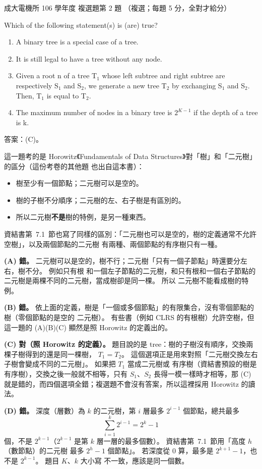 \begin{pastexam}[label={px:ncku-106-ee-ds-02}]{成大電機所 106 學年度 複選題第 2 題}
（複選；每題 5 分，全對才給分）

Which of the following statement(s) is (are) true?
\begin{enumerate}[label=(\Alph*)]
\item A binary tree is a special case of a tree.
\item It is still legal to have a tree without any node.
\item Given a root n of a tree T$_1$ whose left subtree and right subtree are respectively S$_1$ and S$_2$,
we generate a new tree T$_2$ by exchanging S$_1$ and S$_2$. Then, T$_1$ is equal to T$_2$.
\item The maximum number of nodes in a binary tree is $2^{K-1}$ if the depth of a tree is k.
\end{enumerate}
\end{pastexam}

\begin{pastsoln}
答案：(C)。

這一題考的是 Horowitz《Fundamentals of Data Structures》對「樹」和「二元樹」的區分（這份考卷的其他題
也出自這本書）：
\begin{itemize}
\item 樹至少有一個節點；二元樹可以是空的。
\item 樹的子樹不分順序；二元樹的左、右子樹是有區別的。
\item 所以二元樹\textbf{不是}樹的特例，是另一種東西。
\end{itemize}
資結書第~7.1~節也寫了同樣的區別：「二元樹也可以是空的，樹的定義通常不允許空樹」，以及兩個節點的二元樹
有兩種、兩個節點的有序樹只有一種。

\textbf{(A) 錯。} 二元樹可以是空的，樹不行；二元樹「只有一個子節點」時還要分左右，樹不分。 例如只有根
和一個左子節點的二元樹，和只有根和一個右子節點的二元樹是兩棵不同的二元樹，當成樹卻是同一棵。 所以
二元樹不能看成樹的特例。

\textbf{(B) 錯。} 依上面的定義，樹是「一個或多個節點」的有限集合，沒有零個節點的樹（零個節點的是空的
二元樹）。 有些書（例如 CLRS 的有根樹）允許空樹，但這一題的 (A)(B)(C) 顯然是照 Horowitz 的定義出的。

\textbf{(C) 對（照 Horowitz 的定義）。} 題目說的是 tree：樹的子樹沒有順序，交換兩棵子樹得到的還是同一棵樹，
$T_1 = T_2$。 這個選項正是用來對照「二元樹交換左右子樹會變成不同的二元樹」。 如果把 $T_1$ 當成二元樹或
有序樹（資結書預設的樹是有序樹），交換之後一般就不相等，只有 $S_1$、$S_2$ 長得一模一樣時才相等，那 (C)
就是錯的，而四個選項全錯；複選題不會沒有答案，所以這裡採用 Horowitz 的讀法。

\textbf{(D) 錯。} 深度（層數）為 $k$ 的二元樹，第 $i$ 層最多 $2^{i-1}$ 個節點，總共最多
\[
\sum_{i=1}^{k} 2^{i-1} = 2^k - 1
\]
個，不是 $2^{k-1}$（$2^{k-1}$ 是第 $k$ 層一層的最多個數）。 資結書第~7.1~節用「高度 $h$（數節點）的二元樹
最多 $2^h - 1$ 個節點」。 若深度從 $0$ 算，最多是 $2^{k+1} - 1$，也不是 $2^{k-1}$。 題目 $K$、$k$ 大小寫
不一致，應該是同一個數。
\end{pastsoln}
